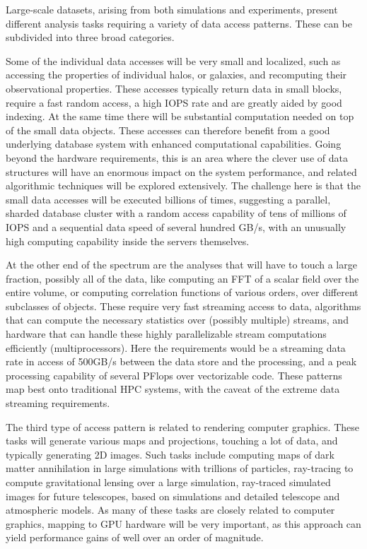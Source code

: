 Large-scale datasets, arising from both simulations and experiments,
present different analysis tasks requiring a variety of data access
patterns. These can be subdivided into three broad categories.

Some of the individual data accesses will be very small and localized,
such as accessing the properties of individual halos, or galaxies, and
recomputing their observational properties. These accesses typically
return data in small blocks, require a fast random access, a high IOPS
rate and are greatly aided by good indexing. At the same time there
will be substantial computation needed on top of the small data
objects. These accesses can therefore benefit from a good underlying
database system with enhanced computational capabilities. Going beyond
the hardware requirements, this is an area where the clever use of
data structures will have an enormous impact on the system
performance, and related algorithmic techniques will be explored
extensively. The challenge here is that the small data accesses will
be executed billions of times, suggesting a parallel, sharded database
cluster with a random access capability of tens of millions of IOPS
and a sequential data speed of several hundred GB/s, with an unusually
high computing capability inside the servers themselves.

At the other end of the spectrum are the analyses that will have to
touch a large fraction, possibly all of the data, like computing an
FFT of a scalar field over the entire volume, or computing correlation
functions of various orders, over different subclasses of
objects. These require very fast streaming access to data, algorithms
that can compute the necessary statistics over (possibly multiple)
streams, and hardware that can handle these highly parallelizable
stream computations efficiently (multiprocessors). Here the
requirements would be a streaming data rate in access of 500GB/s
between the data store and the processing, and a peak processing
capability of several PFlops over vectorizable code. These patterns
map best onto traditional HPC systems, with the caveat of the extreme
data streaming requirements.

The third type of access pattern is related to rendering computer
graphics. These tasks will generate various maps and projections,
touching a lot of data, and typically generating 2D images. Such tasks
include computing maps of dark matter annihilation in large
simulations with trillions of particles, ray-tracing to compute
gravitational lensing over a large simulation, ray-traced simulated
images for future telescopes, based on simulations and detailed
telescope and atmospheric models. As many of these tasks are closely
related to computer graphics, mapping to GPU hardware will be very
important, as this approach can yield performance gains of well over
an order of magnitude.

